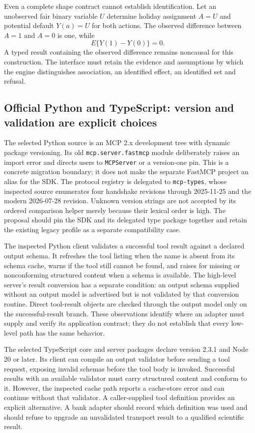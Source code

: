 Even a complete shape contract cannot establish identification. Let an
unobserved fair binary variable $U$ determine holiday assignment $A=U$ and
potential default $Y(a)=U$ for both actions. The observed difference between
$A=1$ and $A=0$ is one, while
\[
 E\{Y(1)-Y(0)\}=0.
\]
A typed result containing the observed difference remains noncausal for this
construction. The interface must retain the evidence and assumptions by which
the engine distinguishes association, an identified effect, an identified
set and refusal.~\citep{exec24_mcp_contracts}

\subsection{Official Python and TypeScript: version and validation are explicit choices}

The selected Python source is an MCP 2.x development tree with dynamic package
versioning. Its old \texttt{mcp.server.fastmcp} module deliberately raises an
import error and directs users to \texttt{MCPServer} or a version-one pin. This
is a concrete migration boundary; it does not make the separate FastMCP
project an alias for the SDK. The protocol registry is delegated to
\texttt{mcp-types}, whose inspected source enumerates four handshake revisions
through 2025-11-25 and the modern 2026-07-28 revision. Unknown version strings
are not accepted by its ordered comparison helper merely because their
lexical order is high. The proposal should pin the SDK and its delegated type
package together and retain the existing legacy profile as a separate
compatibility case.~\citep{exec24_mcp_python}

The inspected Python client validates a successful tool result against a
declared output schema. It refreshes the tool listing when the name is absent
from its schema cache, warns if the tool still cannot be found, and raises
for missing or nonconforming structured content when a schema is available.
The high-level server's result conversion has a separate condition: an output
schema supplied without an output model is advertised but is not validated
by that conversion routine. Direct tool-result objects are checked through
the output model only on the successful-result branch. These observations
identify where an adapter must supply and verify its application contract;
they do not establish that every low-level path has the same behavior.
\citep{exec24_mcp_python}

The selected TypeScript core and server packages declare version 2.3.1 and
Node 20 or later. Its client can compile an output validator before sending a
tool request, exposing invalid schemas before the tool body is invoked.
Successful results with an available validator must carry structured content
and conform to it. However, the inspected cache path reports a cache-store
error and can continue without that validator. A caller-supplied tool
definition provides an explicit alternative. A bank adapter should record
which definition was used and should refuse to upgrade an unvalidated
transport result to a qualified scientific result.~\citep{exec24_mcp_typescript}

